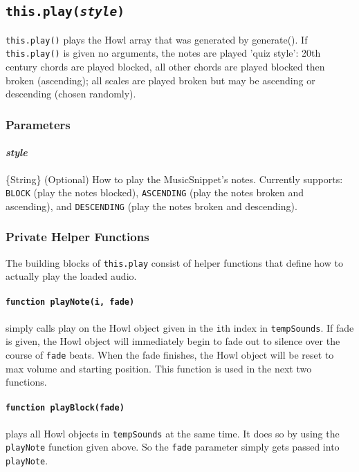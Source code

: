 \documentclass{article}
\begin{document}
\subsection{\texttt{this.play(\textit{style})}}
\texttt{this.play()} plays the Howl array that was generated by generate(). If \texttt{this.play()} is given no arguments, the notes are played 'quiz style': 20th century chords are played blocked, all other chords are played blocked then broken (ascending); all scales are played broken but may be ascending or descending (chosen randomly). 

\subsubsection{Parameters}
\paragraph{\textit{style}} \{String\} (Optional) How to play the MusicSnippet's notes. Currently supports: \texttt{BLOCK} (play the notes blocked), \texttt{ASCENDING} (play the notes broken and ascending), and \texttt{DESCENDING} (play the notes broken and descending).

\subsubsection{Private Helper Functions} The building blocks of \texttt{this.play} consist of helper functions that define how to actually play the loaded audio.

\paragraph{\texttt{function playNote(i, fade)}} simply calls play on the Howl object given in the \texttt{i}th index in \texttt{tempSounds}. If fade is given, the Howl object will immediately begin to fade out to silence over the course of \texttt{fade} beats. When the fade finishes, the Howl object will be reset to max volume and starting position. This function is used in the next two functions.

\paragraph{\texttt{function playBlock(fade)}} plays all Howl objects in \texttt{tempSounds} at the same time. It does so by using the \texttt{playNote} function given above. So the \texttt{fade} parameter simply gets passed into \texttt{playNote}.
\end{document}
